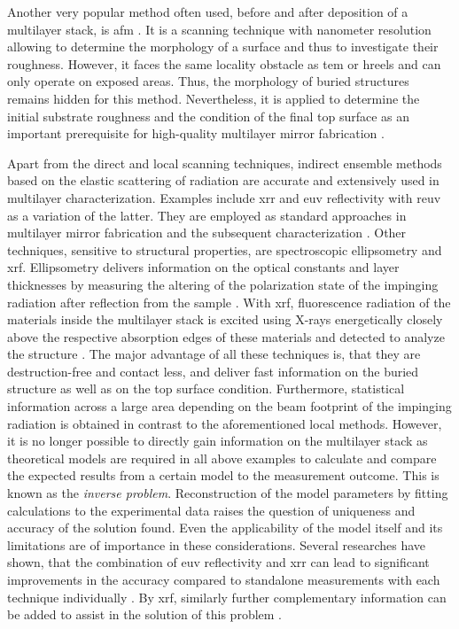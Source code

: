 Another very popular method often used, before and after deposition of a multilayer stack, is \gls{afm} \cite{binnig_atomic_1986}. It is a scanning technique with nanometer resolution allowing to determine the morphology of a surface and thus to investigate their roughness. However, it faces the same locality obstacle as \gls{tem} or \gls{hreels} and can only operate on exposed areas. Thus, the morphology of buried structures remains hidden for this method. Nevertheless, it is applied to determine the initial substrate roughness and the condition of the final top surface as an important prerequisite for high-quality multilayer mirror fabrication \cite{louis_progress_2000, bajt_investigation_2001}.

Apart from the direct and local scanning techniques, indirect ensemble methods based on the elastic scattering of radiation are accurate and extensively used in multilayer characterization. Examples include \gls{xrr} and \gls{euv} reflectivity with \gls{reuv} as a variation of the latter. They are employed as standard approaches in multilayer mirror fabrication and the subsequent characterization \cite{lim_fabrication_2001, bajt_investigation_2001, braun_mo/si_2002,scholze_high-accuracy_2003}. Other techniques, sensitive to structural properties, are spectroscopic ellipsometry and \Gls{xrf}. Ellipsometry delivers information on the optical constants and layer thicknesses by measuring the altering of the polarization state of the impinging radiation after reflection from the sample \cite{arwin_unambiguous_1984, liu_thickness_1999}. With \gls{xrf}, fluorescence radiation of the materials inside the multilayer stack is excited using X-rays energetically closely above the respective absorption edges of these materials and detected to analyze the structure \cite{kortright_standing_1987, kawamura_interface_1994}. The major advantage of all these techniques is, that they are destruction-free and contact less, and deliver fast information on the buried structure as well as on the top surface condition. Furthermore, statistical information across a large area depending on the beam footprint of the impinging radiation is obtained in contrast to the aforementioned local methods. However, it is no longer possible to directly gain information on the multilayer stack as theoretical models are required in all above examples to calculate and compare the expected results from a certain model to the measurement outcome. This is known as the \emph{inverse problem}. Reconstruction of the model parameters by fitting calculations to the experimental data raises the question of uniqueness and accuracy of the solution found. Even the applicability of the model itself and its limitations are of importance in these considerations. Several researches have shown, that the combination of \gls{euv} reflectivity and \gls{xrr} can lead to significant improvements in the accuracy compared to standalone measurements with each technique individually \cite{yakunin_combined_2014}. By \Gls{xrf}, similarly further complementary information can be added to assist in the solution of this problem \cite{ghose_x-ray_2001}.

